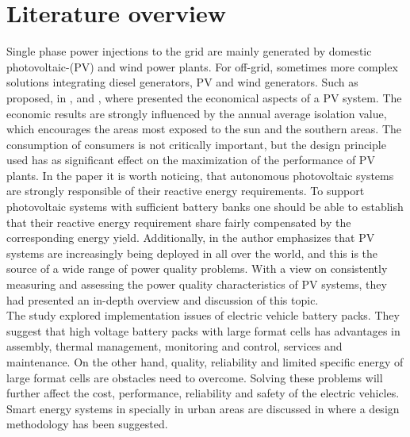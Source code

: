 \section{Literature overview}

Single phase power injections to the grid are mainly generated by domestic photovoltaic-(PV) and wind power plants. For off-grid, sometimes more complex solutions integrating diesel generators, PV and wind generators. Such as proposed, in \cite{shezan2016}, and \cite{cucchiella2013environmental}, where presented the economical aspects of a PV system. The economic results are strongly influenced by the annual average isolation value, which encourages the areas most exposed to the sun and the southern areas. The consumption of consumers is not critically important, but the design principle used has as significant effect on the maximization of the performance of PV plants. In the paper \cite{kaldellis2009optimum} it is worth noticing, that autonomous photovoltaic systems are strongly responsible of their reactive energy requirements. To support photovoltaic systems with sufficient battery banks one should be able to establish that their reactive energy requirement share fairly compensated by the corresponding energy yield. Additionally, in \cite{ortega2013measurement} the author emphasizes that PV systems are increasingly being deployed in all over the world, and this is the source of a wide range of power quality problems. With a view on consistently measuring and assessing the power quality characteristics of PV systems, they had presented an in-depth overview and discussion of this topic.\\
 The study \cite{huat2015integration} explored implementation issues of electric vehicle battery packs. They suggest that high voltage battery packs with large format cells has advantages in assembly, thermal management, monitoring and control, services and maintenance. On the other hand, quality, reliability and limited specific energy of large format cells are obstacles need to overcome. Solving these problems will further affect the cost, performance, reliability and safety of the electric vehicles. Smart energy systems in specially in urban areas are discussed in \cite{lund2015smart} where a design methodology has been suggested.\\
